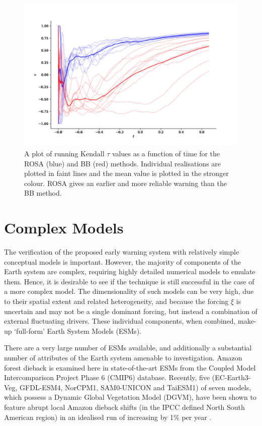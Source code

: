 \begin{figure}
\includegraphics[width=\textwidth,keepaspectratio]{figure3}
\caption[A comparison of ROSA and BB]{A plot of running Kendall $\tau$ values as a function of time for the ROSA (blue) and BB (red) methods.
  Individual realisations are plotted in faint lines and the mean value is plotted in the stronger colour. ROSA gives an earlier and more reliable warning than the BB 
method.}\label{fig:boers_method}
\end{figure}

\section{Complex Models}
The verification of the proposed early warning system with relatively simple conceptual models is important.
However, the majority of components of the Earth system are complex, requiring highly detailed numerical models to emulate them. Hence, it is 
desirable to see if the technique is still successful in the case of
a more complex model. The dimensionality of such models can be very high, due to their spatial extent and related heterogeneity, and 
because the forcing $\xi$ is uncertain and may not be a single dominant forcing,  but instead a combination of external fluctuating drivers.
These individual components, when combined, make-up `full-form' Earth System Models (ESMs).

There are a very large number of ESMs available, and additionally a substantial number of attributes of the Earth system amenable to investigation. Amazon forest dieback is
examined here in state-of-the-art ESMs from the Coupled Model Intercomparison  Project Phase 6 (CMIP6) \parencite{Eyring2016} database. Recently,
five (EC-Earth3-Veg, GFDL-ESM4, NorCPM1, SAM0-UNICON and TaiESM1) of seven models, which possess a Dynamic Global Vegetation Model
(DGVM), have been shown to feature abrupt local Amazon dieback shifts (in the IPCC defined North South American region) in an idealised run
of increasing  by 1\% per year \parencite{Parry2022}.

